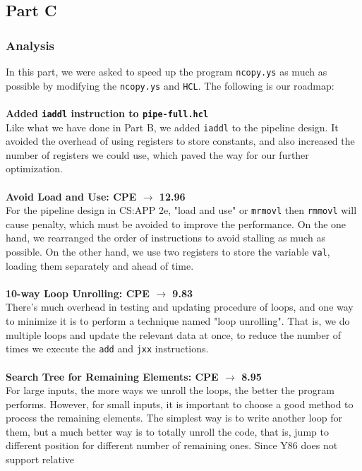 \documentclass{article}
\begin{document}
\subsection{Part C}
\subsubsection{Analysis}
In this part, we were asked to speed up the program \texttt{ncopy.ys} as much as possible by modifying the \texttt{ncopy.ys} and \texttt{HCL}.
The following is our roadmap:\\
\\
\textbf{Added \texttt{iaddl} instruction to \texttt{pipe-full.hcl} }\\
Like what we have done in Part B, we added \texttt{iaddl} to the pipeline design. It avoided the overhead of using registers to store constants, and also increased the number of registers we could use, which paved the way for our further optimization.\\
\\
\textbf{Avoid Load and Use: CPE $\rightarrow$ 12.96} \\
For the pipeline design in CS:APP 2e, "load and use" or \texttt{mrmovl} then \texttt{rmmovl} will cause penalty,
which must be avoided to improve the performance. On the one hand, we rearranged the order of 
instructions to avoid stalling as much as possible. On the other hand, we use two registers to store 
the variable \texttt{val}, loading them separately and ahead of time.\\
\\
\textbf{10-way Loop Unrolling:  CPE $\rightarrow$ 9.83} \\
There's much overhead in testing and updating procedure of loops, and one way to minimize it is to 
perform a technique named "loop unrolling". That is, we do multiple loops and update the relevant 
data at once, to reduce the number of times we execute the \texttt{add} and \texttt{jxx} instructions. \\
\\
\textbf{Search Tree for Remaining Elements:  CPE $\rightarrow$ 8.95} \\
For large inputs, the more ways we unroll the loops, the better the program performs. However, for 
small inputs, it is important to choose a good method to process the remaining elements. The simplest 
way is to write another loop for them, but a much better way is to totally unroll the code, that is, 
jump to different position for different number of remaining ones. Since Y86 does not support relative 
\end{document}
